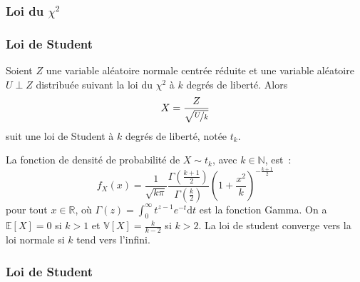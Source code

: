 \documentclass[10pt]{beamer}
\begin{document}
\begin{frame}
  \frametitle{Loi du $\chi^2$}

  \bigskip

  \begin{center}
    
  \end{center}


\end{frame}


\begin{frame}
  \frametitle{Loi de Student}

  \begin{defn}{}
    Soient $Z$ une variable aléatoire normale centrée réduite et une variable aléatoire $U\perp Z$ distribuée suivant la loi du $\chi^2$ à $k$ degrés de liberté. Alors
    \[
      X = \frac{Z}{\sqrt{\nicefrac{U}{k}}}
    \]
    suit une loi de Student à $k$ degrés de liberté, notée $t_k$.
  \end{defn}

  \smallskip

  \begin{prop}\label{prop:student}
    La fonction de densité de probabilité de $X\sim t_k$,
    avec $k\in\mathbb N$, est~:
    \[
      f_X(x) =
      \frac{1}{\sqrt{k\pi}}\frac{\Gamma(\frac{k+1}{2})}{\Gamma(\frac{k}{2})}\left(1+\frac{x^2}{k}\right)^{-\frac{k+1}{2}}
    \]
    pour tout $x\in\mathbb R$, où $\Gamma(z) = \int_0^{\infty}t^{z-1}e^{-t}\mathrm dt$ est la
    fonction Gamma. On a $\mathbb E\left[ X \right]=0$ si $k>1$ et $\mathbb V\left[ X \right] = \frac{k}{k-2}$ si $k>2$. La loi de student converge vers la loi normale si $k$ tend vers l'infini.
  \end{prop}

\end{frame}


\begin{frame}
  \frametitle{Loi de Student}

  \bigskip

  \begin{center}
    
  \end{center}


\end{frame}
\end{document}
